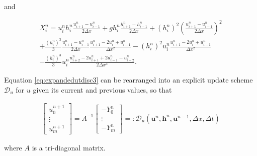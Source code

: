 \documentclass[times]{elsarticle}
\begin{document}
and
\begin{linenomath*}
\begin{multline*}
X_i^n = u_i^nh_i^n\frac{u^{n}_{i+1} -u^{n}_{i-1} }{2 \Delta x} + gh^n_i\frac{h^{n}_{i+1} -h^{n}_{i-1} }{2 \Delta x} + \left(h^n_i\right)^2\left(\frac{u^{n}_{i+1} -u^{n}_{i-1} }{2 \Delta x} \right)^2  \\ + \frac{\left(h^n_i\right)^3}{3}\frac{u^{n}_{i+1} -u^{n}_{i-1} }{2 \Delta x}\frac{u^{n}_{i+1} - 2u^{n}_{i} + u^{n}_{i-1} }{\Delta x^2} - \left(h^n_i\right)^2u_i^n\frac{u^{n}_{i+1} - 2u^{n}_{i} + u^{n}_{i-1} }{\Delta x^2} \\- \frac{\left(h^n_i\right)^3}{3}u^n_i \frac{u^{n}_{i+2} - 2u^{n}_{i+1} + 2u^{n}_{i-1} - u^{n}_{i-2} }{2\Delta x^3}.
\end{multline*}
\end{linenomath*}
 Equation \eqref{eq:expandedutdisc3} can be rearranged into an explicit update scheme $\mathcal{D}_u$ for $u$ given its current and previous values, so that
\begin{linenomath*}
	\begin{gather}
	\left[\begin{array}{c}
	u^{n+1}_0 \\
	\vdots \\
	u^{n+1}_m \end{array}\right]
	= A^{-1} \left[\begin{array}{c}
	-Y^n_0 \\
	\vdots \\
	-Y^n_m \end{array}\right] =: \mathcal{D}_u\left(\boldsymbol{u}^n,\boldsymbol{h}^n, \boldsymbol{u}^{n-1}, \Delta x, \Delta t \right)
	\label{eq:FDcentforu}
	\end{gather}
\end{linenomath*}
where $A$ is a tri-diagonal matrix.
\end{document}
